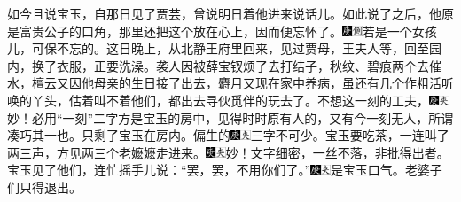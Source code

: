 如今且说宝玉，自那日见了贾芸，曾说明日着他进来说话儿。如此说了之后，他原是富贵公子的口角，那里还把这个放在心上，因而便忘怀了。{\includegraphics[width=3mm]{../Images/00004}\includegraphics[width=3mm]{../Images/00011}\footnotesize \kaishu 若是一个女孩儿，可保不忘的。}这日晚上，从北静王府里回来，见过贾母，王夫人等，回至园内，换了衣服，正要洗澡。袭人因被薛宝钗烦了去打结子，秋纹、碧痕两个去催水，檀云又因他母亲的生日接了出去，麝月又现在家中养病，虽还有几个作粗活听唤的丫头，估着叫不着他们，都出去寻伙觅伴的玩去了。不想这一刻的工夫，{\includegraphics[width=3mm]{../Images/00004}\includegraphics[width=3mm]{../Images/00012}\footnotesize \kaishu 妙！必用``一刻''二字方是宝玉的房中，见得时时原有人的，又有今一刻无人，所谓凑巧其一也。}只剩了宝玉在房内。偏生的{\includegraphics[width=3mm]{../Images/00004}\includegraphics[width=3mm]{../Images/00012}\footnotesize \kaishu 三字不可少。}宝玉要吃茶，一连叫了两三声，方见两三个老嬷嬷走进来。{\includegraphics[width=3mm]{../Images/00004}\includegraphics[width=3mm]{../Images/00012}\footnotesize \kaishu 妙！文字细密，一丝不落，非批得出者。}宝玉见了他们，连忙摇手儿说：``罢，罢，不用你们了。''{\includegraphics[width=3mm]{../Images/00004}\includegraphics[width=3mm]{../Images/00012}\footnotesize \kaishu 是宝玉口气。}老婆子们只得退出。

